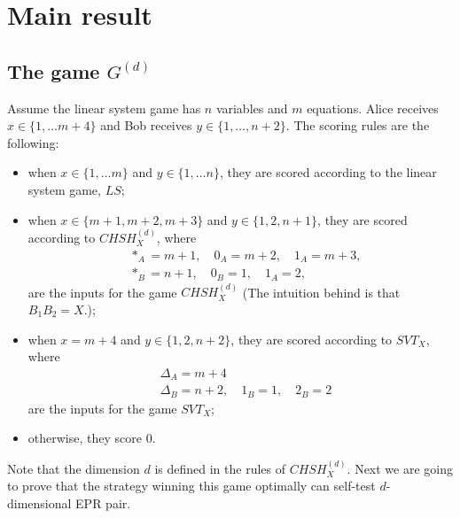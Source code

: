 \documentclass[11pt,letterpaper]{article}
\newcommand{\1}{\mathbb{1}}
\newcommand{\CHSH}{CHSH^{(d)}}
\newcommand{\SVT}{SVT}
\newcommand{\G}[1]{G^{(#1)}}
\newcommand{\LS}{LS}
\newcommand{\tri}{\Delta}
\theoremstyle{definition}
\begin{document}
\section{Main result}
\label{sec:main}
\subsection{The game $\G{d}$}
Assume the linear system game has $n$ variables and $m$ equations.
Alice receives $x \in \{1,\dots m+4 \}$ and Bob receives
$y \in \{1,\dots,n+2\}$. The scoring rules are the following:
\begin{itemize}
	\item when $x \in \{1,\dots m\}$ and $y \in \{1, \dots n\}$, they are scored according to the 
	linear system game, $\LS$;
	\item when $x \in \{m+1, m+2, m+3\}$ and $y \in \{1, 2, n+1\}$, they are scored according to $\CHSH_X$,
	where 
	\begin{align}
		&\ast_A = m+1, \quad 0_A = m+2,\quad 1_A = m+3,\\
		&\ast_B = n+1,\quad 0_B = 1, \quad 1_A = 2,
	\end{align}
	are the inputs for the game $\CHSH_X$
	(The intuition behind is that $B_1B_2 = X$.);
	\item when $x = m+4$ and  $y \in \{1,2,n+2\}$, they are scored according to $\SVT_X$, where
	\begin{align}
		& \tri_A = m+4 \\
		& \tri_B = n+2, \quad 1_B = 1,\quad 2_B = 2
	\end{align}
	are the inputs for the game $\SVT_X$;
	\item otherwise, they score $0$.
\end{itemize}
Note that the dimension $d$ is defined in the rules of $\CHSH_X$.
Next we are going to prove that the strategy winning this game optimally can self-test $d$-dimensional EPR pair.

\end{document}
